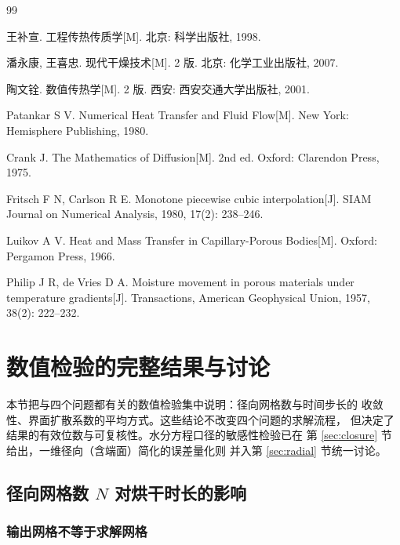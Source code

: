 \documentclass[12pt,a4paper,fontset=none]{ctexart}
\begin{document}
\newpage
\begin{thebibliography}{99}

        王补宣. 工程传热传质学[M]. 北京: 科学出版社, 1998.

        潘永康, 王喜忠. 现代干燥技术[M]. 2 版. 北京: 化学工业出版社, 2007.

        陶文铨. 数值传热学[M]. 2 版. 西安: 西安交通大学出版社, 2001.

        Patankar S V. Numerical Heat Transfer and Fluid Flow[M].
        New York: Hemisphere Publishing, 1980.

        Crank J. The Mathematics of Diffusion[M]. 2nd ed.
        Oxford: Clarendon Press, 1975.

        Fritsch F N, Carlson R E. Monotone piecewise cubic interpolation[J].
        SIAM Journal on Numerical Analysis, 1980, 17(2): 238--246.

        Luikov A V. Heat and Mass Transfer in Capillary-Porous Bodies[M].
        Oxford: Pergamon Press, 1966.

        Philip J R, de Vries D A. Moisture movement in porous materials
        under temperature gradients[J]. Transactions, American Geophysical
        Union, 1957, 38(2): 222--232.

\end{thebibliography}

\appendix
\section{数值检验的完整结果与讨论}
\label{app:num-detail}
本节把与四个问题都有关的数值检验集中说明：径向网格数与时间步长的
收敛性、界面扩散系数的平均方式。这些结论不改变四个问题的求解流程，
但决定了结果的有效位数与可复核性。水分方程口径的敏感性检验已在
第 \ref{sec:closure} 节给出，一维径向（含端面）简化的误差量化则
并入第 \ref{sec:radial} 节统一讨论。

\subsection{径向网格数 $N$ 对烘干时长的影响}
\label{sec:grid}

\subsubsection{输出网格不等于求解网格}
\end{document}
